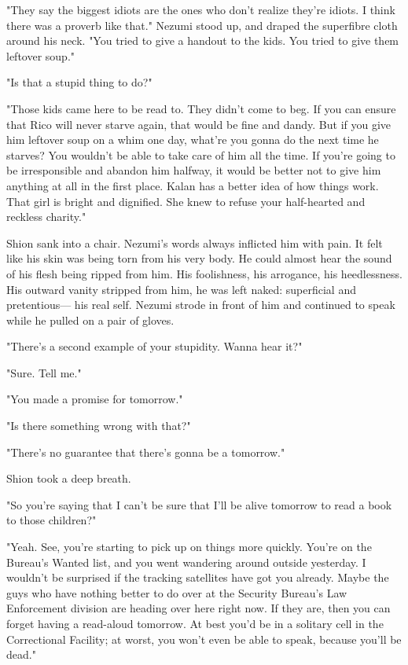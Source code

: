 "They say the biggest idiots are the ones who don't realize they're
idiots. I think there was a proverb like that." Nezumi stood up, and
draped the superfibre cloth around his neck. "You tried to give a
handout to the kids. You tried to give them leftover soup."

"Is that a stupid thing to do?"

"Those kids came here to be read to. They didn't come to beg. If you can
ensure that Rico will never starve again, that would be fine and dandy.
But if you give him leftover soup on a whim one day, what're you gonna
do the next time he starves? You wouldn't be able to take care of him
all the time. If you're going to be irresponsible and abandon him
halfway, it would be better not to give him anything at all in the first
place. Kalan has a better idea of how things work. That girl is bright
and dignified. She knew to refuse your half-hearted and reckless
charity."

Shion sank into a chair. Nezumi's words always inflicted him with pain.
It felt like his skin was being torn from his very body. He could almost
hear the sound of his flesh being ripped from him. His foolishness, his
arrogance, his heedlessness. His outward vanity stripped from him, he
was left naked: superficial and pretentious--- his real self. Nezumi
strode in front of him and continued to speak while he pulled on a pair
of gloves.

"There's a second example of your stupidity. Wanna hear it?"

"Sure. Tell me."

"You made a promise for tomorrow."

"Is there something wrong with that?"

"There's no guarantee that there's gonna be a tomorrow."

Shion took a deep breath.

"So you're saying that I can't be sure that I'll be alive tomorrow to
read a book to those children?"

"Yeah. See, you're starting to pick up on things more quickly. You're on
the Bureau's Wanted list, and you went wandering around outside
yesterday. I wouldn't be surprised if the tracking satellites have got
you already. Maybe the guys who have nothing better to do over at the
Security Bureau's Law Enforcement division are heading over here right
now. If they are, then you can forget having a read-aloud tomorrow. At
best you'd be in a solitary cell in the Correctional Facility; at worst,
you won't even be able to speak, because you'll be dead."

